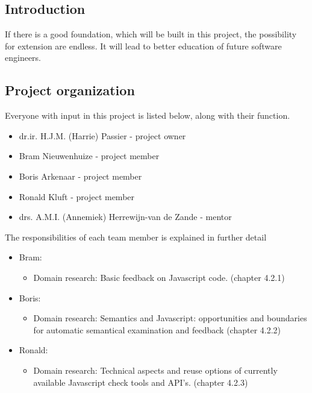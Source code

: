 \documentclass{article}
\begin{document}
\subsection{Introduction} 

If there is a good foundation, which will be built in this project, the 
possibility for extension are endless. It will lead to better education of 
future software engineers. 

\subsection{Project organization} 

Everyone with input in this 
project is listed below, along with their function. \begin{itemize} \item dr.ir. 
H.J.M. (Harrie) Passier - project owner \item Bram Nieuwenhuize - project member 
\item Boris Arkenaar - project member \item Ronald Kluft - project member \item 
drs. A.M.I. (Annemiek) Herrewijn-van de Zande - mentor \end{itemize} The 
responsibilities of each team member is explained in further detail 
\begin{itemize} \item Bram: \begin{itemize} \item Domain research: Basic feedback on 
Javascript code. (chapter 
4.2.1) \end{itemize} \item Boris: \begin{itemize} \item Domain research: 
Semantics and Javascript: opportunities and boundaries for automatic semantical 
examination and feedback (chapter 4.2.2) \end{itemize} \item Ronald: 
\begin{itemize} \item Domain research: Technical aspects and reuse options of 
currently available Javascript check tools and API's. (chapter 4.2.3) 
\end{itemize} \end{itemize} 
\end{document}
